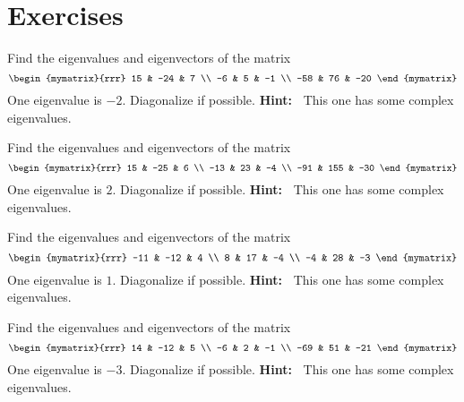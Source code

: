 \section*{Exercises}

\begin{ex} Find the eigenvalues and eigenvectors of the matrix
\begin{equation*}
\begin{mymatrix}{rrr}
15 & -24 & 7 \\
-6 & 5 & -1 \\
-58 & 76 & -20
\end{mymatrix}
\end{equation*}
One eigenvalue is $-2. $ Diagonalize if possible. \textbf{Hint:\ }
This one has some complex eigenvalues.
\end{ex}

\begin{ex} Find the eigenvalues and eigenvectors of the matrix
\begin{equation*}
\begin{mymatrix}{rrr}
15 & -25 & 6 \\
-13 & 23 & -4 \\
-91 & 155 & -30
\end{mymatrix}
\end{equation*}
One eigenvalue is $2$. Diagonalize if possible. \textbf{Hint:\ }
This one has some complex eigenvalues.
\end{ex}

\begin{ex} Find the eigenvalues and eigenvectors of the matrix
\begin{equation*}
\begin{mymatrix}{rrr}
-11 & -12 & 4 \\
8 & 17 & -4 \\
-4 & 28 & -3
\end{mymatrix}
\end{equation*}
One eigenvalue is $1$. Diagonalize if possible. \textbf{Hint:\ }
This one has some complex eigenvalues.
\end{ex}

\begin{ex} Find the eigenvalues and eigenvectors of the matrix
\begin{equation*}
\begin{mymatrix}{rrr}
14 & -12 & 5 \\
-6 & 2 & -1 \\
-69 & 51 & -21
\end{mymatrix}
\end{equation*}
One eigenvalue is $-3$. Diagonalize if possible. \textbf{Hint:\ }
This one has some complex eigenvalues.
\end{ex}

